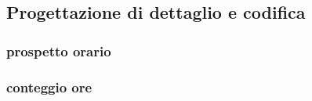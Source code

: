 \subsection{Progettazione di dettaglio e codifica}
	\subsubsection{prospetto orario}
	\subsubsection{conteggio ore}

